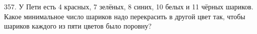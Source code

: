 357. У Пети есть 4 красных, 7 зелёных, 8 синих, 10 белых и 11 чёрных шариков. Какое минимальное число шариков надо перекрасить в другой цвет так, чтобы шариков каждого из пяти цветов было поровну?\\
